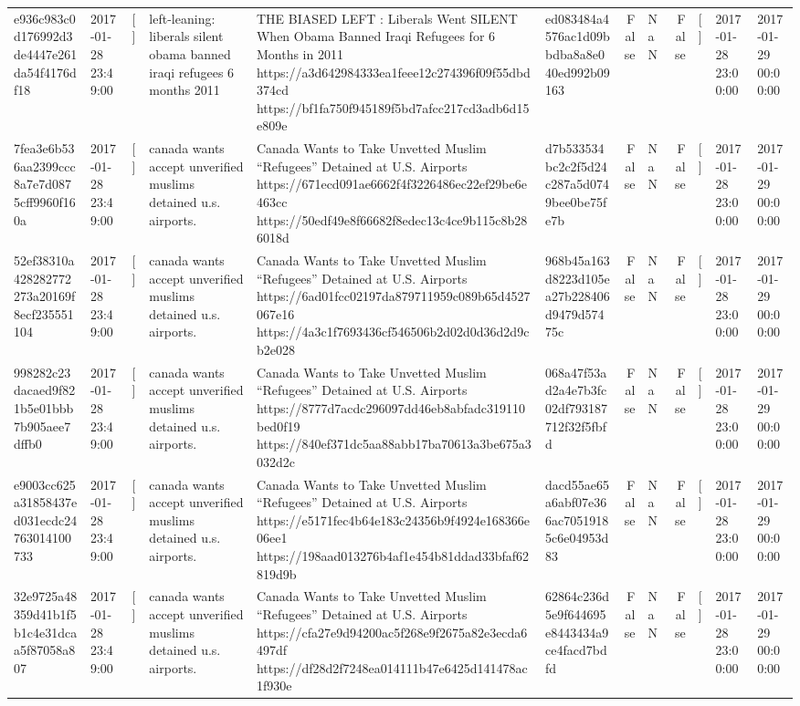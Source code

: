 \begin{tabular}{llllllrlrlll}
e936c983c0d176992d3de4447e261da54f4176df18 & 2017-01-28 23:49:00 & [] & left-leaning: liberals silent obama banned iraqi refugees 6 months 2011 & THE BIASED LEFT : Liberals Went SILENT When Obama Banned Iraqi Refugees for 6 Months in 2011 https://a3d642984333ea1feee12c274396f09f55dbd374cd https://bf1fa750f945189f5bd7afcc217cd3adb6d15e809e & ed083484a4576ac1d09bbdba8a8e040ed992b09163 & False & NaN & False & [] & 2017-01-28 23:00:00 & 2017-01-29 00:00:00 \\
7fea3e6b536aa2399ccc8a7e7d0875cff9960f160a & 2017-01-28 23:49:00 & [] & canada wants accept unverified muslims detained u.s. airports. & Canada Wants to Take Unvetted Muslim “Refugees” Detained at U.S. Airports https://671ecd091ae6662f4f3226486ec22ef29be6e463cc https://50edf49e8f66682f8edec13c4ce9b115c8b286018d & d7b533534bc2c2f5d24c287a5d0749bee0be75fe7b & False & NaN & False & [] & 2017-01-28 23:00:00 & 2017-01-29 00:00:00 \\
52ef38310a428282772273a20169f8ecf235551104 & 2017-01-28 23:49:00 & [] & canada wants accept unverified muslims detained u.s. airports. & Canada Wants to Take Unvetted Muslim “Refugees” Detained at U.S. Airports https://6ad01fcc02197da879711959c089b65d4527067e16 https://4a3c1f7693436cf546506b2d02d0d36d2d9cb2e028 & 968b45a163d8223d105ea27b228406d9479d57475c & False & NaN & False & [] & 2017-01-28 23:00:00 & 2017-01-29 00:00:00 \\
998282c23dacaed9f821b5e01bbb7b905aee7dffb0 & 2017-01-28 23:49:00 & [] & canada wants accept unverified muslims detained u.s. airports. & Canada Wants to Take Unvetted Muslim “Refugees” Detained at U.S. Airports https://8777d7acdc296097dd46eb8abfadc319110bed0f19 https://840ef371dc5aa88abb17ba70613a3be675a3032d2c & 068a47f53ad2a4e7b3fc02df793187712f32f5fbfd & False & NaN & False & [] & 2017-01-28 23:00:00 & 2017-01-29 00:00:00 \\
e9003cc625a31858437ed031ecdc24763014100733 & 2017-01-28 23:49:00 & [] & canada wants accept unverified muslims detained u.s. airports. & Canada Wants to Take Unvetted Muslim “Refugees” Detained at U.S. Airports https://e5171fec4b64e183c24356b9f4924e168366e06ee1 https://198aad013276b4af1e454b81ddad33bfaf62819d9b & dacd55ae65a6abf07e366ac70519185c6e04953d83 & False & NaN & False & [] & 2017-01-28 23:00:00 & 2017-01-29 00:00:00 \\
32e9725a48359d41b1f5b1c4e31dcaa5f87058a807 & 2017-01-28 23:49:00 & [] & canada wants accept unverified muslims detained u.s. airports. & Canada Wants to Take Unvetted Muslim “Refugees” Detained at U.S. Airports https://cfa27e9d94200ac5f268e9f2675a82e3ecda6497df https://df28d2f7248ea014111b47e6425d141478ac1f930e & 62864c236d5e9f644695e8443434a9ce4facd7bdfd & False & NaN & False & [] & 2017-01-28 23:00:00 & 2017-01-29 00:00:00 \\

\end{tabular}
